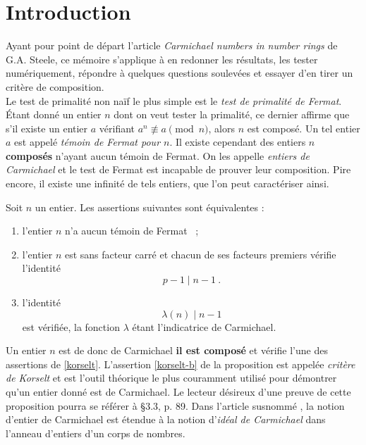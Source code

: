 \section*{Introduction}

Ayant pour point de départ l'article \textit{Carmichael numbers in number rings} \cite{article} de G.A. Steele, ce mémoire s'applique à en redonner les résultats, les tester numériquement, répondre à quelques questions soulevées et essayer d'en tirer un critère de composition. \\

Le test de primalité non naïf le plus simple est le \emph{test de primalité de Fermat}. Étant donné un entier $n$ dont on veut tester la primalité, ce dernier affirme que s'il existe un entier $a$ vérifiant $a^n \not \equiv a \pmod{n}$, alors $n$ est composé. Un tel entier $a$ est appelé \emph{témoin de Fermat pour $n$}. Il existe cependant des entiers $n$ \textbf{composés} n'ayant aucun témoin de Fermat. On les appelle \emph{entiers de Carmichael} et le test de Fermat est incapable de prouver leur composition. Pire encore, il existe une infinité de tels entiers, que l'on peut caractériser ainsi.

\begin{proposition}\label{korselt} Soit $n$ un entier. Les assertions suivantes sont équivalentes :
	\begin{enumerate}[font=\normalshape]
		\item l'entier $n$ n'a aucun témoin de Fermat ~;
		\item l'entier $n$ est sans facteur carré et chacun de ses facteurs premiers vérifie l'identité \[p-1 \mid n-1 ~.\] \label{korselt-b}
		\item l'identité \[\lambda(n) \mid n-1\] est vérifiée, la fonction $\lambda$ étant l'indicatrice de Carmichael.
	\end{enumerate}
\end{proposition}

Un entier $n$ est de donc de Carmichael \ssi \textbf{il est composé} et vérifie l'une des assertions de \ref{korselt}. L'assertion \ref{korselt-b} de la proposition est appelée \textit{critère de Korselt} et est l'outil théorique le plus couramment utilisé pour démontrer qu'un entier donné est de Carmichael. Le lecteur désireux d'une preuve de cette proposition pourra se référer à \cite{Demazure} §3.3, p. 89. Dans l'article susnommé \cite{article}, la notion d'entier de Carmichael est étendue à la notion d'\emph{idéal de Carmichael} dans l'anneau d'entiers d'un corps de nombres.

